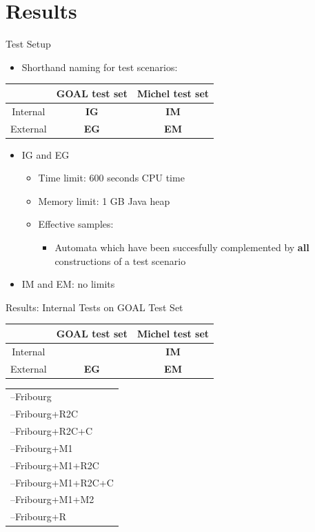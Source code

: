 \documentclass[12pt,handout]{beamer}
\newcommand{\fat}[1]{\textbf{#1}}
\newcommand{\activecell}[1]{\cellcolor{red}\color{white}{#1}}
\newcommand{\myitem}{--\hspace*{\labelsep}}
\newcommand{\igol}{
\begin{tabular}{l}
\myitem Fribourg \\
\myitem Fribourg+R2C \\
\myitem Fribourg+R2C+C \\
\myitem Fribourg+M1 \\
\myitem Fribourg+M1+R2C \\
\myitem Fribourg+M1+R2C+C \\
\myitem Fribourg+M1+M2 \\
\myitem Fribourg+R \\
\end{tabular}}
\begin{document}
\section{Results}

\begin{frame}{Test Setup}
\begin{itemize}
\item Shorthand naming for test scenarios:
\end{itemize}
\centering
{\scriptsize
\renewcommand{\arraystretch}{1.25}
\begin{tabular}{c|c|c}
         & GOAL test set & Michel test set \\ \hline
Internal & \fat{IG}      & \fat{IM}        \\ \hline
External & \fat{EG}      & \fat{EM}        \\
\end{tabular}}
\begin{itemize}
\item IG and EG
  \begin{itemize}
  \item Time limit:   \tabto{2.45cm} 600 seconds CPU time
  \item Memory limit: \tabto{2.45cm} 1 GB Java heap
  \item Effective samples:
    \begin{itemize}
    \item Automata which have been succesfully complemented by \fat{all} constructions of a test scenario
    \end{itemize}
  \end{itemize}
\item IM and EM: no limits
\end{itemize}
\end{frame}

\begin{frame}{Results: Internal Tests on GOAL Test Set}
\begin{center}
{\renewcommand{\arraystretch}{1.25}
\begin{tabular}{c|c|c}
         & GOAL test set & Michel test set \\ \hline
Internal & \activecell{\fat{IG}}     & \fat{IM}        \\ \hline
External & \fat{EG}                  & \fat{EM}        \\
\end{tabular}}

\vspace{0.7cm}
\igol
\end{center}
\end{frame}
\end{document}
